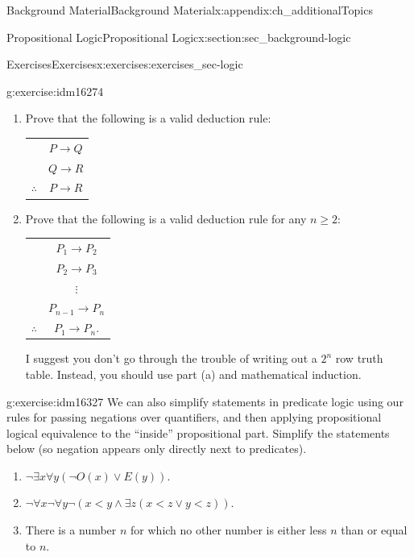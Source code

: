 \documentclass[oneside,10pt,]{book}
\numberwithin{equation}{chapter}
\newcommand{\hrulethin}  {\noalign{\hrule height 0.04em}}
\def\imp{\rightarrow}
\newcommand{\lt}{<}
\begin{document}
\begin{appendixptx}{Background Material}{}{Background Material}{}{}{x:appendix:ch_additionalTopics}
\begin{sectionptx}{Propositional Logic}{}{Propositional Logic}{}{}{x:section:sec_background-logic}
\begin{exercises-subsection}{Exercises}{}{Exercises}{}{}{x:exercises:exercises_sec-logic}
\begin{divisionexercise}{13}{}{}{g:exercise:idm16274}
\par
%
\begin{enumerate}[label=(\alph*)]
\item{}Prove that the following is a valid deduction rule:%
\begin{sidebyside}{1}{0}{0}{0}%
\begin{sbspanel}{1}%
{\centering%
\begin{tabular}{cc}
&\(P \imp Q\)\tabularnewline[0pt]
&\(Q \imp R\)\tabularnewline\hrulethin
\(\therefore\)&\(P \imp R\)
\end{tabular}
\par}
\end{sbspanel}%
\end{sidebyside}%
\item{}Prove that the following is a valid deduction rule for any \(n \ge 2\):%
\begin{sidebyside}{1}{0}{0}{0}%
\begin{sbspanel}{1}%
{\centering%
\begin{tabular}{cc}
&\(P_1 \imp P_2\)\tabularnewline[0pt]
&\(P_2 \imp P_3\)\tabularnewline[0pt]
&\(\vdots\)\tabularnewline[0pt]
&\(P_{n-1} \imp P_n\)\tabularnewline\hrulethin
\(\therefore\)&\(P_1 \imp P_n\).
\end{tabular}
\par}
\end{sbspanel}%
\end{sidebyside}%
\par
I suggest you don't go through the trouble of writing out a \(2^n\) row truth table. Instead, you should use part (a) and mathematical induction. %
\end{enumerate}
%
\end{divisionexercise}%
\begin{divisionexercise}{14}{}{}{g:exercise:idm16327}%
We can also simplify statements in predicate logic using our rules for passing negations over quantifiers, and then applying propositional logical equivalence to the ``inside'' propositional part.  Simplify the statements below (so negation appears only directly next to predicates).%
\par
%
\begin{enumerate}[label=(\alph*)]
\item{}\(\neg \exists x \forall y (\neg O(x) \vee E(y))\).%
\item{}\(\neg \forall x \neg \forall y \neg(x \lt  y \wedge \exists z (x \lt  z \vee y \lt  z))\).%
\item{}There is a number \(n\) for which no other number is either less \(n\) than or equal to \(n\).%

\end{enumerate}
\end{divisionexercise}
\end{exercises-subsection}
\end{sectionptx}
\end{appendixptx}
\end{document}
